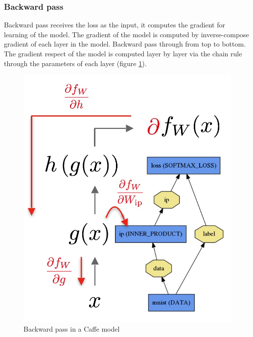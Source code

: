 \subsubsection{Backward pass}
Backward pass receives the loss as the input, it computes the gradient for learning of the model. The gradient of the model is computed by inverse-compose gradient of each layer in the model. Backward pass through from top to bottom. The gradient respect of the model is computed layer by layer via the chain rule through the parameters of each layer (figure \ref{figbackward}).
\begin{figure}[!h]
	\centering
	\includegraphics[scale=0.45]{images/backward}
	\caption{Backward pass in a Caffe model}
	\label{figbackward}
\end{figure}
